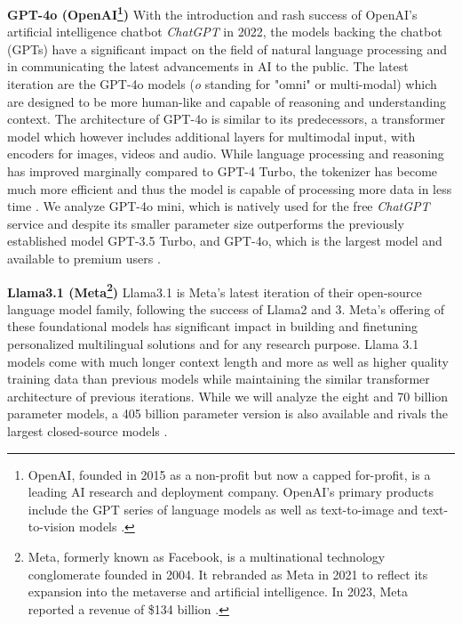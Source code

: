 \par \textbf{GPT-4o (OpenAI\footnote{OpenAI, founded in 2015 as a non-profit but now a capped for-profit, is a leading AI research and deployment company. OpenAI's primary products include the GPT series of language models as well as text-to-image and text-to-vision models \parencite{openai2024about}.})} With the introduction and rash success of OpenAI's artificial intelligence chatbot \textit{ChatGPT} in 2022, the models backing the chatbot (GPTs) have a significant impact on the field of natural language processing and in communicating the latest advancements in AI to the public. The latest iteration are the GPT-4o models (\textit{o} standing for "omni" or multi-modal) which are designed to be more human-like and capable of reasoning and understanding context. The architecture of GPT-4o is similar to its predecessors, a transformer model which however includes additional layers for multimodal input, with encoders for images, videos and audio. While language processing and reasoning has improved marginally compared to GPT-4 Turbo, the tokenizer has become much more efficient and thus the model is capable of processing more data in less time \parencite{achiam2023gpt, openai2024gpt4o}. We analyze GPT-4o mini, which is natively used for the free \textit{ChatGPT} service and despite its smaller parameter size outperforms the previously established model GPT-3.5 Turbo, and GPT-4o, which is the largest model and available to premium users \parencite{openai2024gpt4omini}.

\par \textbf{Llama3.1 (Meta\footnote{Meta, formerly known as Facebook, is a multinational technology conglomerate founded in 2004. It rebranded as Meta in 2021 to reflect its expansion into the metaverse and artificial intelligence. In 2023, Meta reported a revenue of \$134 billion \parencite{meta2024about}.})} Llama3.1 is Meta's latest iteration of their open-source language model family, following the success of Llama2 and 3. Meta's offering of these foundational models has significant impact in building and finetuning personalized multilingual solutions and for any research purpose. Llama 3.1 models come with much longer context length and more as well as higher quality training data than previous models while maintaining the similar transformer architecture of previous iterations. While we will analyze the eight and 70 billion parameter models, a 405 billion parameter version is also available and rivals the largest closed-source models \parencite{dubey2024llama,meta2024llama31}.

